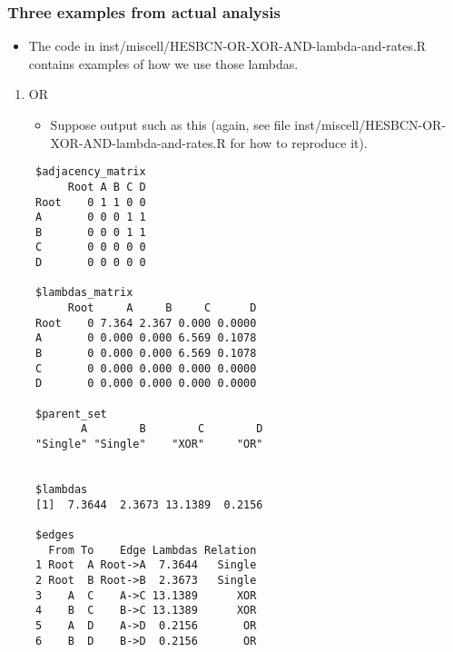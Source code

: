 \documentclass[11pt]{article}
\begin{document}
\subsubsection{Three examples from actual analysis}
\label{sec:orgdc3f991}
\begin{itemize}
\item The code in inst/miscell/HESBCN-OR-XOR-AND-lambda-and-rates.R contains examples of how we use those lambdas.
\end{itemize}
\begin{enumerate}
\item OR
\label{sec:org9d47997}
\begin{itemize}
\item Suppose output such as this (again, see file inst/miscell/HESBCN-OR-XOR-AND-lambda-and-rates.R for how to reproduce it).
\end{itemize}

\begin{verbatim}
 $adjacency_matrix
      Root A B C D
 Root    0 1 1 0 0
 A       0 0 0 1 1
 B       0 0 0 1 1
 C       0 0 0 0 0
 D       0 0 0 0 0

 $lambdas_matrix
      Root     A     B     C      D
 Root    0 7.364 2.367 0.000 0.0000
 A       0 0.000 0.000 6.569 0.1078
 B       0 0.000 0.000 6.569 0.1078
 C       0 0.000 0.000 0.000 0.0000
 D       0 0.000 0.000 0.000 0.0000

 $parent_set
        A        B        C        D 
 "Single" "Single"    "XOR"     "OR" 


 $lambdas
 [1]  7.3644  2.3673 13.1389  0.2156

 $edges
   From To    Edge Lambdas Relation
 1 Root  A Root->A  7.3644   Single
 2 Root  B Root->B  2.3673   Single
 3    A  C    A->C 13.1389      XOR
 4    B  C    B->C 13.1389      XOR
 5    A  D    A->D  0.2156       OR
 6    B  D    B->D  0.2156       OR


\end{verbatim}


\end{enumerate}
\end{document}
